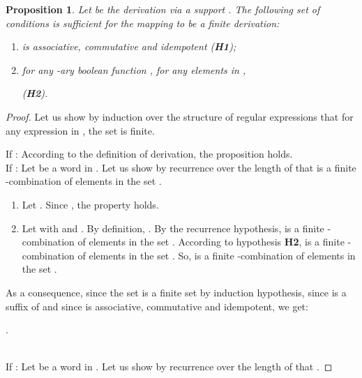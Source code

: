 \documentclass{article}
\newtheorem{proposition}{Proposition}
\begin{document}
    \begin{proposition}\label{prop finitude}
    Let  be the derivation via a support . The following set of conditions is sufficient for the mapping  to be a finite derivation:
    
      \begin{enumerate}
        \item  is associative, commutative and idempotent (\textbf{H1});
        \item for any -ary boolean function , for any  elements  in ,
        
        \centerline{
           (\textbf{H2}).
        }
      \end{enumerate}
      
  \end{proposition}
  \begin{proof}  
    Let us show by induction over the structure of regular expressions that for any expression  in , the set  is finite.
    
    
     If  :      
        According to the definition of derivation, the proposition holds. \\
           
           
       If :
        Let  be a word in . 
        Let us show by recurrence over the length of  that  is a finite -combination of elements in the set .
          \begin{enumerate}
            \item Let . Since , the property holds.
            \item Let  with  and . By definition, . By the recurrence hypothesis,  is a finite -combination of elements in the set . According to hypothesis \textbf{H2},  is a finite -combination of elements in the set . So,  is a finite -combination of elements in the set .
          \end{enumerate}  
          
          
        As a consequence, since the set  is a finite set by induction hypothesis, since  is a suffix of   and since  is associative, commutative and idempotent, we get:
          
          \centerline{
            .
          } 
          
\ \\
        
        
        
        
    If :      
        Let  be a word in .
         Let us show by recurrence over the length of  that  .
          

\end{proof}
\end{document}
